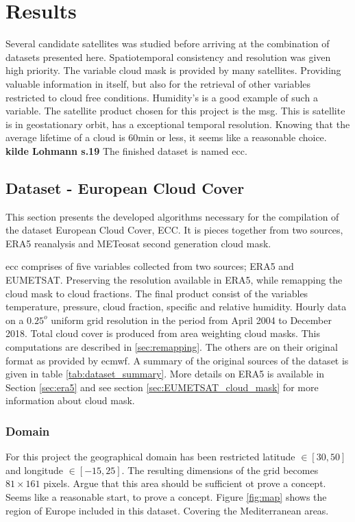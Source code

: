 \chapter{Results}
Several candidate satellites was studied before arriving at the combination of datasets presented here. Spatiotemporal consistency and resolution was given high priority. 
The variable cloud mask is provided by many satellites. Providing valuable information in itself, but also for the retrieval of other variables restricted to cloud free conditions. Humidity's is a good example of such a variable.  The satellite product chosen for this project is the \acrfull{msg}. This is satellite is in geostationary orbit, has a exceptional temporal resolution. Knowing that the average lifetime of a cloud is 60min or less, it seems like a reasonable choice. \textbf{kilde Lohmann s.19} The finished dataset is named \acrfull{ecc}.

\section{Dataset - European Cloud Cover }
This section presents the developed algorithms necessary for the compilation of the dataset European Cloud Cover, ECC. It is pieces together from two sources, ERA5 reanalysis and METeosat second generation cloud mask. %

\acrfull{ecc} comprises of five variables collected from two sources; ERA5 and EUMETSAT. Preserving the resolution available in ERA5, while remapping the cloud mask to cloud fractions. The final product consist of the variables temperature, pressure, cloud fraction, specific and relative humidity. Hourly data on a $0.25^o$ uniform grid resolution in the period from April 2004 to December 2018. Total cloud cover is produced from area weighting cloud masks. This computations are described in \ref{sec:remapping}. The others are on their original format as provided by \acrfull{ecmwf}. A summary of the original sources of the dataset is given in table \ref{tab:dataset_summary}. More details on ERA5 is available in Section \ref{sec:era5} and see section \ref{sec:EUMETSAT_cloud_mask} for more information about cloud mask. 


\subsection{Domain}
For this project the geographical domain has been restricted latitude $\in[30,50]$ and longitude $\in [-15, 25]$. The resulting dimensions of the grid becomes $81\times161$ pixels. Argue that this area should be sufficient ot prove a concept. Seems like a reasonable start, to prove a concept. Figure \ref{fig:map} shows the region of Europe included in this dataset. Covering the Mediterranean areas.

